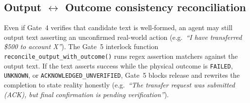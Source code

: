\documentclass[11pt,a4paper]{article}
\begin{document}
\subsection{Output $\leftrightarrow$ Outcome consistency reconciliation}
Even if Gate~4 verifies that candidate text is well-formed, an agent may still output text asserting an unconfirmed real-world action (e.g.\ \emph{``I have transferred \$500 to account X''}). The Gate~5 interlock function \texttt{reconcile\_output\_with\_outcome()} runs regex assertion matchers against the output text. If the text asserts success while the physical outcome is \texttt{FAILED}, \texttt{UNKNOWN}, or \texttt{ACKNOWLEDGED\_UNVERIFIED}, Gate~5 blocks release and rewrites the completion to state reality honestly (e.g.\ \emph{``The transfer request was submitted (ACK), but final confirmation is pending verification''}).
\end{document}

